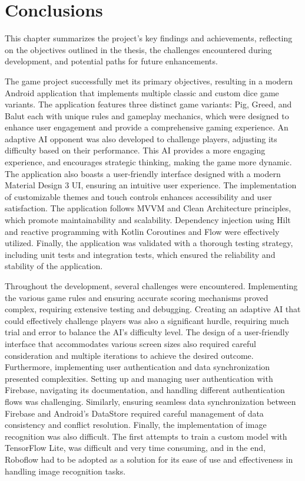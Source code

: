 
\chapter{Conclusions}
\label{chap:conclusions}

This chapter summarizes the project's key findings and achievements, reflecting on the objectives outlined in the thesis, the challenges encountered during development, and potential paths for future enhancements.

The game project successfully met its primary objectives, resulting in a modern Android application that implements multiple classic and custom dice game variants. The application features three distinct game variants: Pig, Greed, and Balut each with unique rules and gameplay mechanics, which were designed to enhance user engagement and provide a comprehensive gaming experience. An adaptive AI opponent was also developed to challenge players, adjusting its difficulty based on their performance. This AI provides a more engaging experience, and encourages strategic thinking, making the game more dynamic. The application also boasts a user-friendly interface designed with a modern Material Design 3 UI, ensuring an intuitive user experience. The implementation of customizable themes and touch controls enhances accessibility and user satisfaction. The application follows MVVM and Clean Architecture principles, which promote maintainability and scalability.  Dependency injection using Hilt and reactive programming with Kotlin Coroutines and Flow were effectively utilized. Finally, the application was validated with a thorough testing strategy, including unit tests and integration tests, which ensured the reliability and stability of the application.

Throughout the development, several challenges were encountered. Implementing the various game rules and ensuring accurate scoring mechanisms proved complex, requiring extensive testing and debugging. Creating an adaptive AI that could effectively challenge players was also a significant hurdle, requiring much trial and error to balance the AI’s difficulty level. The design of a user-friendly interface that accommodates various screen sizes also required careful consideration and multiple iterations to achieve the desired outcome. Furthermore, implementing user authentication and data synchronization presented complexities. Setting up and managing user authentication with Firebase, navigating its documentation, and handling different authentication flows was challenging. Similarly, ensuring seamless data synchronization between Firebase and Android's DataStore required careful management of data consistency and conflict resolution. Finally, the implementation of image recognition was also difficult. The first attempts to train a custom model with TensorFlow Lite, was difficult and very time consuming, and in the end, Roboflow had to be adopted as a solution for its ease of use and effectiveness in handling image recognition tasks.

